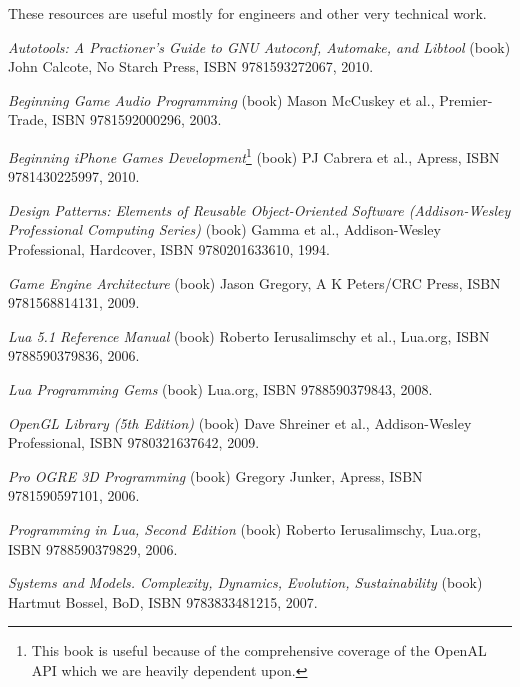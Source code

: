 
These resources are useful mostly for engineers and other very technical work.

\startitemize[3]
\setupwhitespace[big]
\item
{\it Autotools: A Practioner's Guide to GNU Autoconf, Automake, and Libtool} (book)\crlf
John Calcote, No Starch Press, ISBN 9781593272067, 2010.

\item
{\it Beginning Game Audio Programming} (book)\crlf
Mason McCuskey et al., Premier-Trade, ISBN 9781592000296, 2003.

\item
{\it Beginning iPhone Games Development}\footnote{This book is useful because of the comprehensive coverage of the OpenAL API which we are heavily dependent upon.} (book)\crlf
PJ Cabrera et al., Apress, ISBN 9781430225997, 2010.

\item
{\it Design Patterns: Elements of Reusable Object-Oriented Software (Addison-Wesley Professional Computing Series)} (book)\crlf
Gamma et al., Addison-Wesley Professional, Hardcover, ISBN 9780201633610, 1994.

\item
{\it Game Engine Architecture} (book)\crlf
Jason Gregory, A K Peters/CRC Press, ISBN 9781568814131, 2009.

\item
{\it Lua 5.1 Reference Manual} (book)\crlf
Roberto Ierusalimschy et al., Lua.org, ISBN 9788590379836, 2006.

\item
{\it Lua Programming Gems} (book)\crlf
Lua.org, ISBN 9788590379843, 2008.

\item
{\it OpenGL Library (5th Edition)} (book)\crlf
Dave Shreiner et al., Addison-Wesley Professional, ISBN 9780321637642, 2009.

\item
{\it Pro OGRE 3D Programming} (book)\crlf
Gregory Junker, Apress, ISBN 9781590597101, 2006.

\item
{\it Programming in Lua, Second Edition} (book)\crlf
Roberto Ierusalimschy, Lua.org, ISBN 9788590379829, 2006.

\item
{\it Systems and Models. Complexity, Dynamics, Evolution, Sustainability} (book)\crlf
Hartmut Bossel, BoD, ISBN 9783833481215, 2007.

